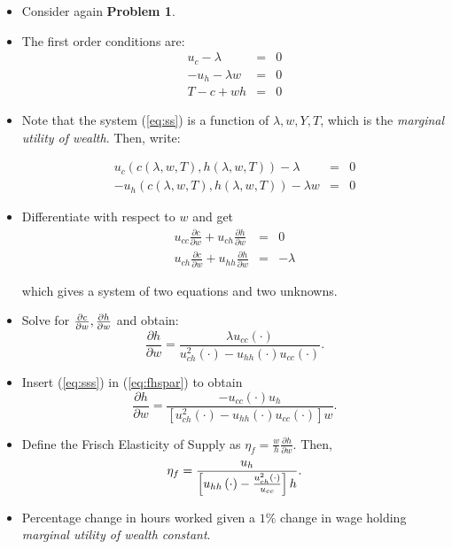 \documentclass[11pt]{article}
\begin{document}
\begin{itemize}
\item Consider again \textbf{Problem 1}. 

\item The first order conditions are: 
\begin{eqnarray}
u_{c}-\lambda  &=&0   \nonumber \\
-u_{h}-\lambda w &=&0 \nonumber \\
T-c+wh &=&0           \label{eq:ss}
\end{eqnarray}

\item Note that the system (\ref{eq:ss}) is a function of $\lambda, w, Y, T$, which is the \textit{marginal utility of wealth}. Then, write:

\begin{eqnarray}
u_{c}(c(\lambda,w,T),h(\lambda,w,T))-\lambda  &=&0    \nonumber \\
-u_{h}(c(\lambda,w,T),h(\lambda,w,T))-\lambda w &=&0  \label{eq:sss}
\end{eqnarray}

\item Differentiate with respect to $w$ and get%
\begin{eqnarray}
u_{cc}\frac{\partial c}{\partial w}+u_{ch}\frac{\partial
h}{\partial w} &=&0 \\
u_{ch}\frac{\partial c}{\partial w}+u_{hh}\frac{\partial
h}{\partial w} &=&-\lambda
\end{eqnarray}

which gives a system of two equations and two unknowns.

\item Solve for $\frac{\partial c}{\partial w},\frac{\partial h}{%
\partial w}$ and obtain:
\begin{equation}
\frac{\partial h}{\partial w}=\frac{\lambda u_{cc}\left(
\cdot \right) }{u_{ch}^{2}\left( \cdot \right) -u_{hh}\left(
\cdot \right) u_{cc}\left( \cdot \right) }. \label{eq:fhspar}
\end{equation}
\end{itemize}

\begin{itemize}
\item Insert (\ref{eq:sss}) in (\ref{eq:fhspar}) to obtain
\begin{equation}
\frac{\partial h}{\partial w}=\frac{-u_{cc}\left( \cdot \right)
u_{h}}{\left[ u_{ch}^{2}\left( \cdot \right)
-u_{hh}\left( \cdot \right) u_{cc}\left( \cdot \right) %
\right] w}.
\end{equation}

\item Define the Frisch Elasticity of Supply as $\eta _{f}=\frac{w}{h}%
\frac{\partial h}{\partial w}$. Then,%
\begin{equation}
\eta _{f}=\frac{u_{h}}{\left[ u_{hh}\left( \cdot \right) -\frac{%
u_{ch}^{2}\left( \cdot \right) }{u_{cc}}\right] h}.
\end{equation}

\item Percentage change in hours worked given a $1\%$ change in wage holding 
\textit{marginal utility of wealth constant}.
\end{itemize}
\end{document}
